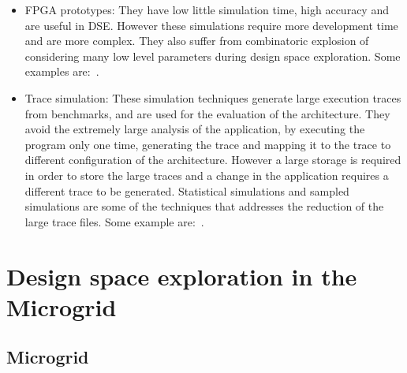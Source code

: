 \documentclass{article}
\begin{document}
\begin{itemize}

\item FPGA prototypes: They have low little simulation time, high accuracy and are
    useful in DSE. However these simulations require more development time and
    are more complex. They also suffer from combinatoric explosion of
    considering many low level parameters during design space exploration. Some examples
    are:~\cite{Pellauer:2008:QPM:1547560.1548281,Penry06exploitingparallelism,Chiou:2007:FST:1331699.1331723,4287395}.

\item Trace simulation: These simulation techniques generate large execution
    traces from benchmarks, and are used for the evaluation of the
    architecture. They avoid the extremely large analysis of the application,
    by executing the program only one time, generating the trace and mapping it
    to the trace to different configuration of the architecture. However a
    large storage is required in order to store the large traces and a change
    in the application requires a different trace to be generated. Statistical
    simulations and sampled simulations are some of the techniques that
    addresses the reduction of the large trace files. Some example
    are:~\cite{Conte:1996:RSL:645464.653497,IYEN96,Lafage:1999:CCT:646664.700765}.

\end{itemize}

\section{Design space exploration in the Microgrid}
\label{sn:dse_microgrid}

\subsection{Microgrid}
\end{document}
